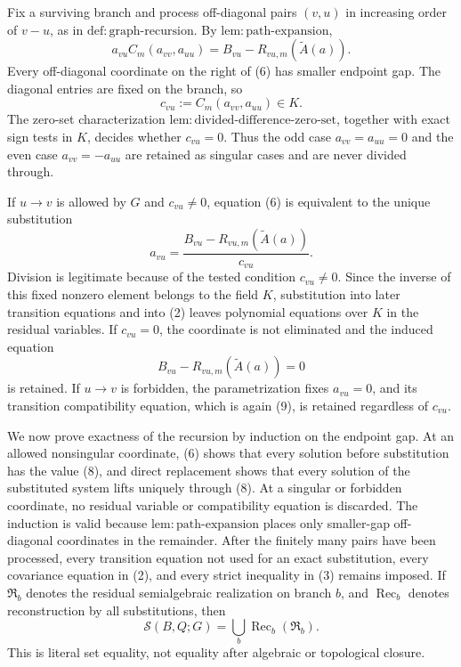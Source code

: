 Fix a surviving branch and process off-diagonal pairs \((v,u)\) in increasing order of \(v-u\), as in \(\mathrm{def{:}graph\mbox{-}recursion}\).  By \(\mathrm{lem{:}path\mbox{-}expansion}\),
\[
 a_{vu}C_m(a_{vv},a_{uu})
 =B_{vu}-R_{vu,m}(\widetilde A(a)).                               \tag{6}
\]
Every off-diagonal coordinate on the right of (6) has smaller endpoint gap.  The diagonal entries are fixed on the branch, so
\[
 c_{vu}:=C_m(a_{vv},a_{uu})\in K.                                \tag{7}
\]
The zero-set characterization \(\mathrm{lem{:}divided\mbox{-}difference\mbox{-}zero\mbox{-}set}\), together with exact sign tests in \(K\), decides whether \(c_{vu}=0\).  Thus the odd case \(a_{vv}=a_{uu}=0\) and the even case \(a_{vv}=-a_{uu}\) are retained as singular cases and are never divided through.

If \(u\to v\) is allowed by \(G\) and \(c_{vu}\ne0\), equation (6) is equivalent to the unique substitution
\[
 a_{vu}
 =\frac{B_{vu}-R_{vu,m}(\widetilde A(a))}{c_{vu}}.                \tag{8}
\]
Division is legitimate because of the tested condition \(c_{vu}\ne0\).  Since the inverse of this fixed nonzero element belongs to the field \(K\), substitution into later transition equations and into (2) leaves polynomial equations over \(K\) in the residual variables.  If \(c_{vu}=0\), the coordinate is not eliminated and the induced equation
\[
 B_{vu}-R_{vu,m}(\widetilde A(a))=0                               \tag{9}
\]
is retained.  If \(u\to v\) is forbidden, the parametrization fixes \(a_{vu}=0\), and its transition compatibility equation, which is again (9), is retained regardless of \(c_{vu}\).

We now prove exactness of the recursion by induction on the endpoint gap.  At an allowed nonsingular coordinate, (6) shows that every solution before substitution has the value (8), and direct replacement shows that every solution of the substituted system lifts uniquely through (8).  At a singular or forbidden coordinate, no residual variable or compatibility equation is discarded.  The induction is valid because \(\mathrm{lem{:}path\mbox{-}expansion}\) places only smaller-gap off-diagonal coordinates in the remainder.  After the finitely many pairs have been processed, every transition equation not used for an exact substitution, every covariance equation in (2), and every strict inequality in (3) remains imposed.  If \(\mathfrak R_b\) denotes the residual semialgebraic realization on branch \(b\), and \(\operatorname{Rec}_b\) denotes reconstruction by all substitutions, then
\[
 \mathcal S(B,Q;G)
 =\bigcup_b\operatorname{Rec}_b(\mathfrak R_b).                  \tag{10}
\]
This is literal set equality, not equality after algebraic or topological closure.

